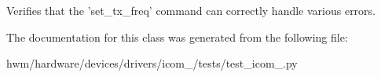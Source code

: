 Verifies that the 'set\-\_\-tx\-\_\-freq' command can correctly handle various errors. 



The documentation for this class was generated from the following file\-:\begin{DoxyCompactItemize}
\item 
hwm/hardware/devices/drivers/icom\-\_/tests/test\-\_\-icom\-\_.\-py\end{DoxyCompactItemize}
